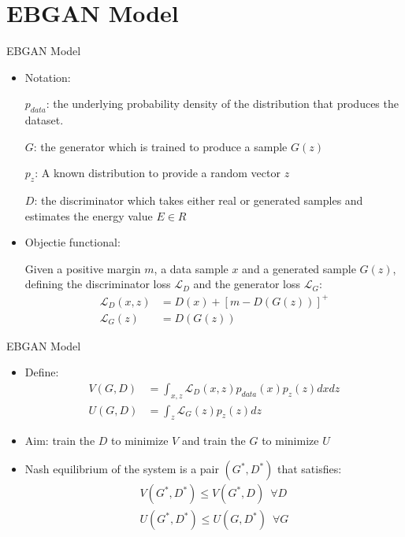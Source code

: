\documentclass[mathserif]{beamer}
\begin{document}
\section{EBGAN Model}
\begin{frame}{EBGAN Model}
\begin{itemize}
  \item Notation:

  $p_{data}$: the underlying probability density of the distribution that produces the dataset.

  $G$: the generator which is trained to produce a sample $G(z)$

  $p_{z}$: A known distribution to provide a random vector $z$

  $D$: the discriminator which takes either real or generated samples and estimates the energy
  value $E\in R$
\end{itemize}
\begin{itemize}
  \item Objectie functional:

  Given a positive margin $m$, a data sample $x$ and a generated sample $G(z)$, defining the
  discriminator loss $\mathcal{L}_{D}$ and the generator loss $\mathcal{L}_{G}$:
  \begin{align}
    \mathcal{L}_{D}(x,z)&=D(x)+[m-D(G(z))]^{+}\\
    \mathcal{L}_{G}(z)&=D(G(z))
  \end{align}
\end{itemize}
\end{frame}
\begin{frame}{EBGAN Model}
  \begin{itemize}
    \item Define:
    \begin{align}
      V(G,D)&=\int_{x,z}\mathcal{L}_{D}(x,z)p_{data}(x)p_{z}(z)dxdz\\
      U(G,D)&=\int_{z}\mathcal{L}_{G}(z)p_{z}(z)dz
    \end{align}

    \item Aim: train the $D$ to minimize $V$ and
    train the $G$ to minimize $U$

    \item Nash equilibrium of the system is a pair $(G^{*},D^{*})$ that satisfies:
    \begin{align}
      V(G^{*},D^{*})\le V(G^{*},D)\hspace{6pt}\forall D\\
      U(G^{*},D^{*})\le U(G,D^{*})\hspace{6pt}\forall G
    \end{align}
  \end{itemize}
\end{frame}
\end{document}
